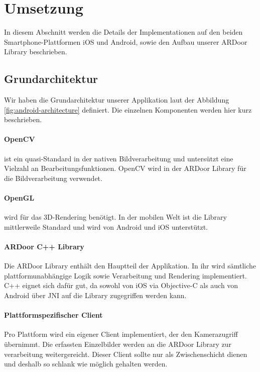 \documentclass[main.tex]{subfiles}
\begin{document}
\section{Umsetzung}
In diesem Abschnitt werden die Details der Implementationen auf den beiden Smartphone-Plattformen iOS und Android, sowie den Aufbau unserer ARDoor Library beschrieben.

\subsection{Grundarchitektur}
Wir haben die Grundarchitektur unserer Applikation laut der Abbildung \ref{fig:android-architecture} definiert. Die einzelnen Komponenten werden hier kurz beschrieben.

\paragraph{OpenCV}
ist ein quasi-Standard in der nativen Bildverarbeitung und untersützt eine Vielzahl an Bearbeitungsfunktionen. OpenCV wird in der ARDoor Library für die Bildverarbeitung verwendet.

\paragraph{OpenGL}
wird für das 3D-Rendering benötigt. In der mobilen Welt ist die Library mittlerweile Standard und wird von Android und iOS unterstützt.

\paragraph{ARDoor C++ Library}
Die ARDoor Library enthält den Hauptteil der Applikation. In ihr wird sämtliche plattformunabhängige Logik sowie Verarbeitung und Rendering implementiert. C++ eignet sich  dafür gut, da sowohl von iOS via Objective-C als auch von Android über JNI auf die Library zugegriffen werden kann.

\paragraph{Plattformspezifischer Client}
Pro Plattform wird ein eigener Client implementiert, der den Kamerazugriff übernimmt. Die erfassten Einzelbilder werden an die ARDoor Library zur verarbeitung weitergereicht. Dieser Client sollte nur als Zwischenschicht dienen und deshalb so schlank wie möglich gehalten werden. 
\end{document}
